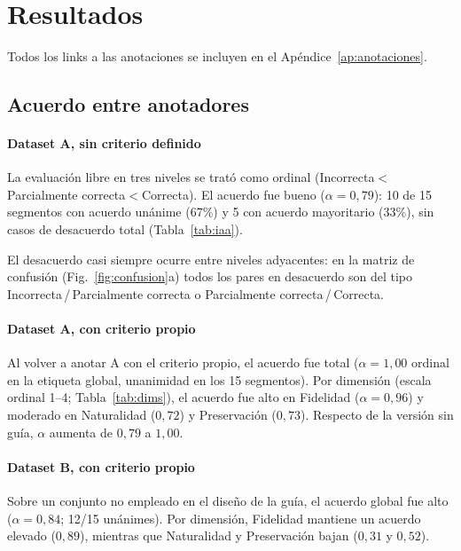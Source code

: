 \section{Resultados}
\label{sec:resultados}

Todos los links a las anotaciones se incluyen en el
Apéndice~\ref{ap:anotaciones}. 

\subsection{Acuerdo entre anotadores}
\label{sec:res-iaa}

\paragraph{Dataset A, sin criterio definido}

La evaluación libre en tres niveles se trató como ordinal
(Incorrecta${<}$Parcialmente correcta${<}$Correcta). El acuerdo fue bueno
($\alpha=0{,}79$): 10 de 15 segmentos con acuerdo unánime (67\%) y 5 con acuerdo
mayoritario (33\%), sin casos de desacuerdo total (Tabla~\ref{tab:iaa}). 

El desacuerdo casi siempre ocurre entre niveles adyacentes: en la matriz de confusión
(Fig.~\ref{fig:confusion}a) todos los pares en desacuerdo son del tipo 
Incorrecta\,/\,Parcialmente correcta o Parcialmente correcta\,/\,Correcta.

\paragraph{Dataset A, con criterio propio}

Al volver a anotar A con el criterio propio, el acuerdo fue total
($\alpha=1{,}00$ ordinal en la etiqueta global, unanimidad en los 15 segmentos). Por dimensión (escala ordinal 1--4;
Tabla~\ref{tab:dims}), el acuerdo fue alto en Fidelidad ($\alpha=0{,}96$) y
moderado en Naturalidad ($0{,}72$) y Preservación ($0{,}73$). Respecto de la
versión sin guía, $\alpha$ aumenta de $0{,}79$ a $1{,}00$.


\paragraph{Dataset B, con criterio propio}


Sobre un conjunto no empleado en el diseño de la guía, el acuerdo global fue alto
($\alpha=0{,}84$; 12/15 unánimes). Por dimensión, Fidelidad mantiene un acuerdo
elevado ($0{,}89$), mientras que Naturalidad y Preservación bajan ($0{,}31$ y
$0{,}52$). 

